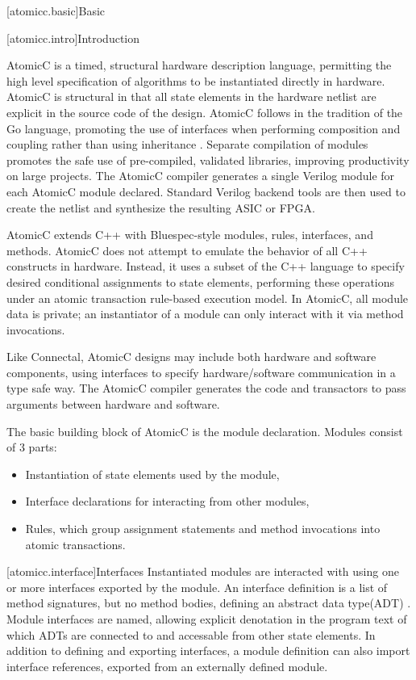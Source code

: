 [atomicc.basic]{Basic}

[atomicc.intro]{Introduction}

AtomicC is a timed, structural hardware description language, permitting
the high level specification of algorithms to be instantiated
directly in hardware.
AtomicC is structural in that all state elements in the hardware
netlist are explicit in the source code of the design.
AtomicC follows in the tradition of the Go language,
promoting the use of interfaces when performing composition and
coupling rather than using inheritance \cite{Pike2012}.
Separate compilation of modules promotes the safe use of pre-compiled, validated
libraries, improving productivity on large projects.
The AtomicC compiler 
generates a single Verilog module for each AtomicC module declared.
Standard Verilog backend tools are then used to create the netlist and synthesize
the resulting ASIC or FPGA.

AtomicC extends C++
with Bluespec-style\cite{Bluespec:www,Hoe:Thesis,HoeArvind:TRS_Synthesis2}
modules, rules, interfaces, and methods.
AtomicC does not attempt to emulate the behavior of all C++ constructs in hardware.
Instead, it uses a subset of the C++ language to specify desired
conditional assignments to state elements,
performing these operations under an atomic transaction rule-based execution model.
In AtomicC, all module data is private; an instantiator of a module can only 
interact with it via method invocations.

Like Connectal, AtomicC designs may include both hardware and
software components, using interfaces to specify hardware/software communication
in a type safe way. The AtomicC compiler generates the code and transactors to pass
arguments between hardware and software.

The basic building block of AtomicC is the module declaration.
Modules consist of 3 parts:
\begin{itemize}
\item Instantiation of state elements used by the module,
\item Interface declarations for interacting from other modules,
\item Rules, which group assignment statements and method invocations into atomic transactions.
\end{itemize}

[atomicc.interface]{Interfaces}
Instantiated modules are interacted with using one or more interfaces exported by the module.
An interface definition is a list of method signatures, but no method bodies, defining
an abstract data type(ADT) \cite{Liskov74programmingwith}.
Module interfaces are named, 
allowing explicit denotation in the program text
of which ADTs are connected to and accessable from other state elements.
In addition to defining and exporting interfaces,
a module definition can also import
interface references, exported from an
externally defined module.

